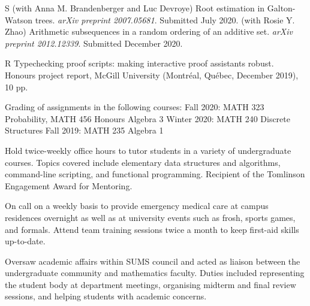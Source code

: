 
\pubbegin S
\subitem (with Anna M. Brandenberger and Luc Devroye)
Root estimation in Galton-Watson trees. {\sl arXiv preprint 2007.05681}.
Submitted July 2020.
\subitem (with Rosie Y. Zhao)
Arithmetic subsequences in a random ordering of an additive set. {\sl arXiv preprint 2012.12339}.
Submitted December 2020.


\pubbegin R
\repitem Typechecking proof scripts: making interactive proof assistants robust.
Honours project report, McGill University (Montr\'eal, Qu\'ebec, December 2019), 10 pp.

\filbreak


\smallskip
Grading of assignments in the following courses:
\begingroup\parindent=10pt
\smallskip
\thing Fall 2020: MATH 323 Probability, MATH 456 Honours Algebra 3
\smallskip
\thing Winter 2020: MATH 240 Discrete Structures
\smallskip
\thing Fall 2019: MATH 235 Algebra 1
\endgroup
\medbreak

\smallskip
Hold twice-weekly office hours to tutor students in a variety of undergraduate courses.
Topics covered include elementary data structures and algorithms, command-line scripting,
and functional programming. Recipient of the Tomlinson Engagement Award for Mentoring.
\medbreak

\smallskip
On call on a weekly basis to provide emergency medical care at campus residences overnight as well as at
university events such as frosh, sports games, and formals. Attend team training sessions twice a month to keep
first-aid skills up-to-date.
\medbreak

\smallskip
Oversaw academic affairs within SUMS council and acted as liaison between the undergraduate community and
mathematics faculty. Duties included representing the student body at department meetings,
organising midterm and final review sessions,
and helping students with
academic concerns.
\medbreak

